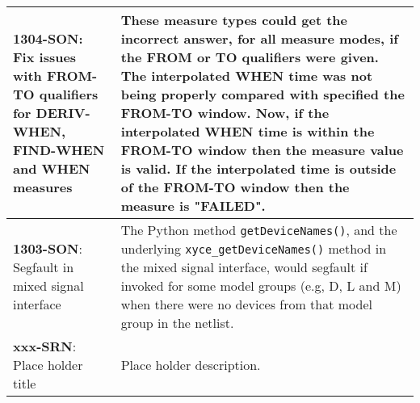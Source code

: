 {\begin{longtable}[h] {>{\raggedright\small}m{2in}|>{\raggedright\let\\\tabularnewline\small}m{3.5in}}
\textbf{1304-SON}: Fix issues with FROM-TO qualifiers for DERIV-WHEN,
FIND-WHEN and WHEN measures & These measure types could get the incorrect
answer, for all measure modes, if the FROM or TO qualifiers
were given.  The interpolated WHEN time was not being properly compared with
specified the FROM-TO window.  Now, if the interpolated WHEN time is within
the FROM-TO window then the measure value is valid.  If the interpolated
time is outside of the FROM-TO window then the measure is "FAILED".
\\ \hline

\textbf{1303-SON}: Segfault in mixed signal interface &
The Python method \texttt{getDeviceNames()}, and the underlying
\texttt{xyce\_getDeviceNames()} method in the mixed signal interface,
would segfault if invoked for some model groups (e.g, D, L and M) when
there were no devices from that model group in the \Xyce{} netlist.
\\ \hline

\textbf{xxx-SRN}: Place holder title &
Place holder description.  \\ \hline
\end{longtable}
}
